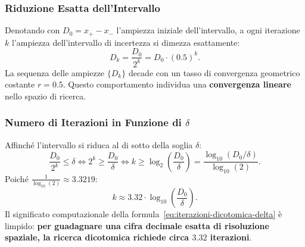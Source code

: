 \subsubsection{Riduzione Esatta dell'Intervallo}
Denotando con $D_0 = x_+ - x_-$ l'ampiezza iniziale dell'intervallo, a ogni iterazione $k$ l'ampiezza dell'intervallo di incertezza si dimezza esattamente:
\begin{equation}
    D_k = \frac{D_0}{2^k} = D_0 \cdot (0.5)^k.
\end{equation}
La sequenza delle ampiezze $\{D_k\}$ decade con un tasso di convergenza geometrico costante $r = 0.5$. Questo comportamento individua una \textbf{convergenza lineare} nello spazio di ricerca.

\subsubsection{Numero di Iterazioni in Funzione di $\delta$}
Affinch\'e l'intervallo si riduca al di sotto della soglia $\delta$:
\begin{equation}
    \frac{D_0}{2^k} \le \delta \iff 2^k \ge \frac{D_0}{\delta} \iff k \ge \log_2\left(\frac{D_0}{\delta}\right) = \frac{\log_{10}(D_0/\delta)}{\log_{10}(2)}.
\end{equation}
Poich\'e $\frac{1}{\log_{10}(2)} \approx 3.3219$:
\begin{equation}
    k \approx 3.32 \cdot \log_{10}\left(\frac{D_0}{\delta}\right).
    \label{eq:iterazioni-dicotomica-delta}
\end{equation}
Il significato computazionale della formula~\eqref{eq:iterazioni-dicotomica-delta} \`e limpido: \textbf{per guadagnare una cifra decimale esatta di risoluzione spaziale, la ricerca dicotomica richiede circa $3.32$ iterazioni}.

